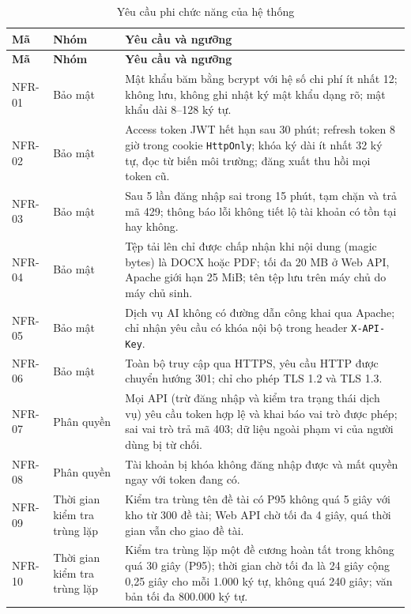\documentclass[../main.tex]{subfiles}
\begin{document}
{\renewcommand{\arraystretch}{1.2}
\begin{longtable}{|p{1.6cm}|>{\raggedright\arraybackslash}p{2.5cm}|p{10.9cm}|}
\caption{Yêu cầu phi chức năng của hệ thống}\label{tab:c2-nfr}\\
\hline
\textbf{Mã} & \textbf{Nhóm} & \textbf{Yêu cầu và ngưỡng} \\
\hline
\endfirsthead
\hline
\textbf{Mã} & \textbf{Nhóm} & \textbf{Yêu cầu và ngưỡng} \\
\hline
\endhead
NFR-01 & Bảo mật & Mật khẩu băm bằng bcrypt với hệ số chi phí ít nhất 12; không lưu, không ghi nhật ký mật khẩu dạng rõ; mật khẩu dài 8--128 ký tự. \\
\hline
NFR-02 & Bảo mật & Access token JWT hết hạn sau 30 phút; refresh token 8 giờ trong cookie \texttt{HttpOnly}; khóa ký dài ít nhất 32 ký tự, đọc từ biến môi trường; đăng xuất thu hồi mọi token cũ. \\
\hline
NFR-03 & Bảo mật & Sau 5 lần đăng nhập sai trong 15 phút, tạm chặn và trả mã 429; thông báo lỗi không tiết lộ tài khoản có tồn tại hay không. \\
\hline
NFR-04 & Bảo mật & Tệp tải lên chỉ được chấp nhận khi nội dung (magic bytes) là DOCX hoặc PDF; tối đa 20 MB ở Web API, Apache giới hạn 25 MiB; tên tệp lưu trên máy chủ do máy chủ sinh. \\
\hline
NFR-05 & Bảo mật & Dịch vụ AI không có đường dẫn công khai qua Apache; chỉ nhận yêu cầu có khóa nội bộ trong header \texttt{X-API-Key}. \\
\hline
NFR-06 & Bảo mật & Toàn bộ truy cập qua HTTPS, yêu cầu HTTP được chuyển hướng 301; chỉ cho phép TLS 1.2 và TLS 1.3. \\
\hline
NFR-07 & Phân quyền & Mọi API (trừ đăng nhập và kiểm tra trạng thái dịch vụ) yêu cầu token hợp lệ và khai báo vai trò được phép; sai vai trò trả mã 403; dữ liệu ngoài phạm vi của người dùng bị từ chối. \\
\hline
NFR-08 & Phân quyền & Tài khoản bị khóa không đăng nhập được và mất quyền ngay với token đang có. \\
\hline
NFR-09 & Thời gian kiểm tra trùng lặp & Kiểm tra trùng tên đề tài có P95 không quá 5 giây với kho từ 300 đề tài; Web API chờ tối đa 4 giây, quá thời gian vẫn cho giao đề tài. \\
\hline
NFR-10 & Thời gian kiểm tra trùng lặp & Kiểm tra trùng lặp một đề cương hoàn tất trong không quá 30 giây (P95); thời gian chờ tối đa là 24 giây cộng 0,25 giây cho mỗi 1.000 ký tự, không quá 240 giây; văn bản tối đa 800.000 ký tự. \\

\end{longtable}}
\end{document}
